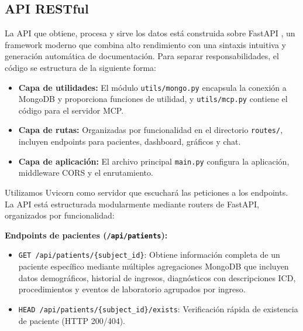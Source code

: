 




\subsection{API RESTful}

La API que obtiene, procesa y sirve los datos está construida sobre FastAPI \cite{fastapi}, un framework moderno que combina alto rendimiento con una sintaxis intuitiva y generación automática de documentación. Para separar responsabilidades, el código se estructura de la siguiente forma:

\begin{itemize}
\item \textbf{Capa de utilidades:} El módulo \texttt{utils/mongo.py} encapsula la conexión a MongoDB y proporciona funciones de utilidad, y \texttt{utils/mcp.py} contiene el código para el servidor MCP.
\item \textbf{Capa de rutas:} Organizadas por funcionalidad en el directorio \texttt{routes/}, incluyen endpoints para pacientes, dashboard, gráficos y chat.
\item \textbf{Capa de aplicación:} El archivo principal \texttt{main.py} configura la aplicación, middleware CORS y el enrutamiento.
\end{itemize}

Utilizamos Uvicorn \cite{uvicorn} como servidor que escuchará las peticiones a los endpoints. La API está estructurada modularmente mediante routers de FastAPI, organizados por funcionalidad:

\textbf{Endpoints de pacientes (\texttt{/api/patients}):}
\begin{itemize}
\item \texttt{GET /api/patients/\{subject\_id\}}: Obtiene información completa de un paciente específico mediante múltiples agregaciones MongoDB que incluyen datos demográficos, historial de ingresos, diagnósticos con descripciones ICD, procedimientos y eventos de laboratorio agrupados por ingreso.
\item \texttt{HEAD /api/patients/\{subject\_id\}/exists}: Verificación rápida de existencia de paciente (HTTP 200/404).
\end{itemize}


